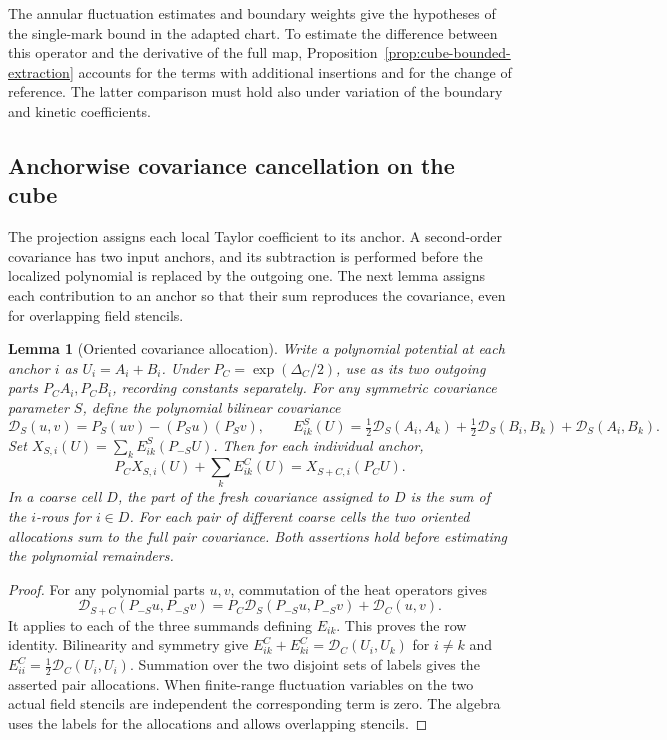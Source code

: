 \documentclass[11pt]{article}
\newtheorem{lemma}[theorem]{Lemma}
\theoremstyle{definition}
\begin{document}
The annular fluctuation estimates and boundary weights give the
hypotheses of the single-mark bound in the adapted chart. To estimate
the difference between this operator and the derivative of the full
map, Proposition~\ref{prop:cube-bounded-extraction} accounts for the
terms with additional insertions and for the change of reference.
The latter comparison must hold also under variation of the boundary
and kinetic coefficients.

\subsection{Anchorwise covariance cancellation on the cube}
\label{sec:cube-covariance-cancel}

The projection assigns each local Taylor coefficient to its anchor.
A second-order covariance has two input anchors, and its subtraction
is performed before the localized polynomial is replaced by the
outgoing one. The next lemma assigns each contribution to an anchor
so that their sum reproduces the covariance, even for overlapping
field stencils.

\begin{lemma}[Oriented covariance allocation]\label{lem:cube-oriented}
Write a polynomial potential at each anchor \(i\) as \(U_i=A_i+B_i\).
Under \(P_C=\exp(\Delta_C/2)\), use as its two outgoing parts
\(P_C A_i,P_C B_i\), recording constants separately.
For any symmetric covariance parameter \(S\), define the polynomial
bilinear covariance
\begin{equation}
 \mathcal D_S(u,v)=P_S(uv)-(P_Su)(P_Sv),\qquad
 E^S_{ik}(U)=\tfrac12\mathcal D_S(A_i,A_k)
             +\tfrac12\mathcal D_S(B_i,B_k)+\mathcal D_S(A_i,B_k).
\end{equation}
Set \(X_{S,i}(U)=\sum_k E_{ik}^S(P_{-S}U)\).
Then for each individual anchor,
\begin{equation}
 P_C X_{S,i}(U)+\sum_k E^C_{ik}(U)=X_{S+C,i}(P_CU).
\end{equation}
In a coarse cell \(D\), the part of the fresh covariance assigned to
\(D\) is the sum of the \(i\)-rows for \(i\in D\).
For each pair of different coarse cells the two oriented allocations
sum to the full pair covariance. Both assertions hold before
estimating the polynomial remainders.
\end{lemma}

\begin{proof}
For any polynomial parts \(u,v\), commutation of the heat operators
gives
\begin{equation}
 \mathcal D_{S+C}(P_{-S}u,P_{-S}v)
 =P_C\mathcal D_S(P_{-S}u,P_{-S}v)+\mathcal D_C(u,v).
\end{equation}
It applies to each of the three summands defining \(E_{ik}\).
This proves the row identity. Bilinearity and symmetry give
\(E^C_{ik}+E^C_{ki}=\mathcal D_C(U_i,U_k)\) for \(i\ne k\) and
\(E^C_{ii}=\tfrac12\mathcal D_C(U_i,U_i)\).
Summation over the two disjoint sets of labels gives the asserted
pair allocations. When finite-range fluctuation variables on the
two actual field stencils are independent the corresponding term
is zero. The algebra uses the labels for the allocations and
allows overlapping stencils.
\end{proof}
\end{document}
